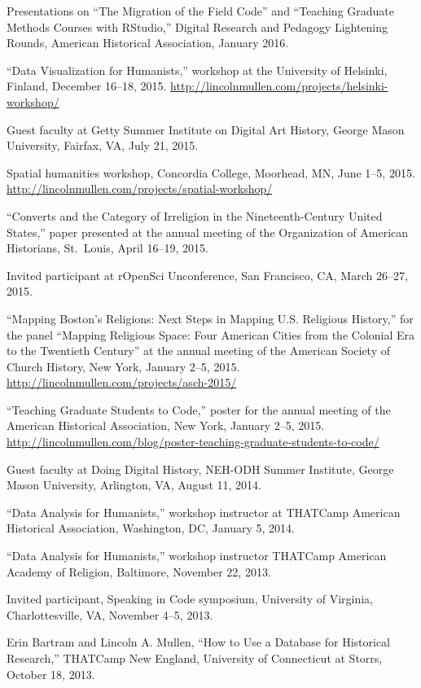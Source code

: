 \documentclass[11pt]{article}
\begin{document}
Presentations on ``The Migration of the Field Code'' and ``Teaching 
Graduate Methods Courses with RStudio,'' Digital Research and Pedagogy 
Lightening Rounds, American Historical Association, January 2016.

``Data Visualization for Humanists,'' workshop at the University of Helsinki, 
Finland, December 16--18, 2015. 
\url{http://lincolnmullen.com/projects/helsinki-workshop/}

Guest faculty at Getty Summer Institute on 
Digital Art History, George Mason University, Fairfax, VA, July 21, 2015.

Spatial humanities workshop, Concordia College, Moorhead, MN, June 1--5, 2015.  
\url{http://lincolnmullen.com/projects/spatial-workshop/}

``Converts and the Category of Irreligion in the Nineteenth-Century
United States,'' paper presented at the annual meeting of the
Organization of American Historians, St.~Louis, April 16--19, 2015.

Invited participant at rOpenSci Unconference, San Francisco, CA, March 26--27, 2015.

``Mapping Boston's Religions: Next Steps in Mapping U.S. Religious History,'' 
for the panel ``Mapping Religious Space: Four American Cities from the 
Colonial Era to the Twentieth Century'' at the annual meeting of the American 
Society of Church History, New York, January 2--5, 2015.  
\url{http://lincolnmullen.com/projects/asch-2015/}

``Teaching Graduate Students to Code,'' poster for the annual meeting of the
American Historical Association, New York, January 2--5, 2015.
\url{http://lincolnmullen.com/blog/poster-teaching-graduate-students-to-code/}

Guest faculty at Doing Digital History, NEH-ODH 
Summer Institute, George Mason University, Arlington, VA, August 11, 2014.

``Data Analysis for Humanists,'' workshop instructor at THATCamp American Historical Association, 
Washington, DC, January 5, 2014.

``Data Analysis for Humanists,'' workshop instructor THATCamp American Academy of Religion, Baltimore, November 22, 2013.

Invited participant, Speaking in Code symposium, University of Virginia, 
Charlottesville, VA, November 4--5, 2013.

Erin Bartram and Lincoln A. Mullen, ``How to Use a Database for Historical 
Research,'' THATCamp New England, University of Connecticut at Storrs, October 
18, 2013.
\end{document}
